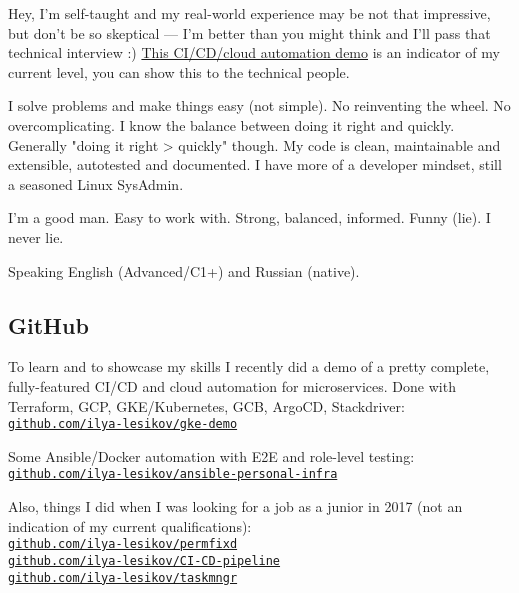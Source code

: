 \documentclass[11pt, a4paper]{article}
\newcommand{\Delimitline}{
  \vspace{-2ex}
  \noindent\makebox[\linewidth]{\rule{\DelimitlineLength}{0.12ex}} }
\newcommand\rurl[1]{%
  \-\hspace{0.5em}
  \href{http://#1}{\nolinkurl{#1}}%
}
\newcommand{\forceindent}{\leavevmode{\parindent=1em\indent}}
\begin{document}
\forceindent Hey, I'm self-taught and my real-world experience may be not that impressive, but don't be so skeptical — I'm better than you might think and I'll pass that technical interview :) \href{https://github.com/ilya-lesikov/gke-demo}{This CI/CD/cloud automation demo} is an indicator of my current level, you can show this to the technical people.

\forceindent I solve problems and make things easy (not simple). No reinventing the wheel. No overcomplicating. I know the balance between doing it right and quickly. Generally "doing it right > quickly" though. My code is clean, maintainable and extensible, autotested and documented. I have more of a developer mindset, still a seasoned Linux SysAdmin.

\forceindent I'm a good man. Easy to work with. Strong, balanced, informed. Funny (lie). I never lie.

\forceindent Speaking English (Advanced/C1+) and Russian (native).


\subsection*{GitHub}
\Delimitline

\forceindent To learn and to showcase my skills I recently did a demo of a pretty complete, fully-featured CI/CD and cloud automation for microservices. Done with Terraform, GCP, GKE/Kubernetes, GCB, ArgoCD, Stackdriver:\vspace{0.2em}\\
\rurl{github.com/ilya-lesikov/gke-demo}

Some Ansible/Docker automation with E2E and role-level testing:\vspace{0.2em}\\
\rurl{github.com/ilya-lesikov/ansible-personal-infra}

Also, things I did when I was looking for a job as a junior in 2017 (not an indication of my current qualifications):\vspace{0.2em}\\
\rurl{github.com/ilya-lesikov/permfixd}\\
\rurl{github.com/ilya-lesikov/CI-CD-pipeline}\\
\rurl{github.com/ilya-lesikov/taskmngr}

\end{document}
